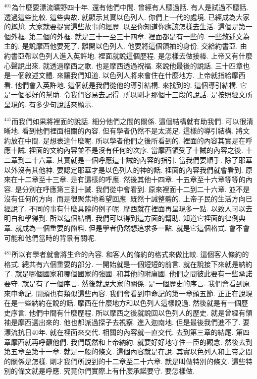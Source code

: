 \documentclass{book}
\begin{document}
$^{401}$為什麼要漂流曠野四十年.
還有他們中間.
曾經有人聽過話.
有人是試過不聽話.
透過這些比較.
這些典故.
就顯示其實以色列人.
你們上一代的處境.
已經成為大家的尷尬.
大家就要捉實這些故事的經歷.
以至你知道你應該怎樣去生活.
這個是第一個外框.
第二個的外框.
就是三十一至三十四章.
裡面都是有一些的.
一些敘述文為主的.
是說摩西他要死了.
離開以色列人.
他要將這個領袖的身份.
交給約書亞.
由約書亞帶以色列人進入英許地.
裡面就說這個歷程.
是怎樣去做接棒.
上帝又有什麼心聲說出來.
就透過摩西之歌.
也是摩西透過祝福.
來說他最後的說話.
三十四章也是一個敘述文體.
來讓我們知道.
以色列人將來會住在什麼地方.
上帝就指給摩西看.
他們會入英許地.
這個就是我們從他的導引結構.
來找到的.
這個導引結構.
它是一個挺好的幫助.
令我們容易去記得.
所以剛才那個十三段的說話.
是按照經文所呈現的.
有多少句說話來顯示.

$^{441}$而我們如果將裡面的說話.
細分他們之間的關係.
這個結構就有助我們.
可以很清晰地.
看到他們裡面相關的內容.
但有學者仍然不是太滿足.
這樣的導引結構.
將文約放在中間.
是想表達什麼呢.
所以學者他們之後所看到的.
裡面的內容其實是在呼應十誡.
裡面的文約內容並不是沒有任何的次序.
當摩西領受了十誡的內容之後.
十二章到二十六章.
其實就是一個呼應這十誡的內容的指引.
當我們要順手.
除了耶華以外沒有其他神.
要認定耶華才是以色列人的神的話.
裡面的內容我們就會看到.
原來在十二章至十三章.
是有這樣的呼應.
然後其他十四章.
十五章至十六章等等的內容.
是分別在呼應第三到十誡.
我們從中會看到.
原來裡面十二到二十六章.
並不是沒有任何的方向.
而是很聚焦地希望回應.
既然十誡整體的.
上帝子民的生活方向已經說了.
不同的事有什麼具體的例子呢.
摩西就在裡面再呈現多一點.
以致人可以去明白和學得到.
所以這個結構.
我們可以得到這方面的幫助.
知道它裡面的律例典章.
就成為一個重要的餡料.
但是學者仍然想追求多一點.
就是它這個格式.
會不會可能和他們當時的背景有關呢.

$^{481}$所以有學者就會將生命的內容.
和客人的條約的格式來做比較.
這個客人條約的格式.
總共有六個重要的部分.
一開始就是一個短短的前言.
就在說接下來就是納約了.
就是哪個國家和哪個國家的強國.
和其他的附庸國.
他們之間彼此要有一些承諾要守.
就是有了一個序言.
然後就說大家的關係.
是一個歷史的序言.
我們會看到原來申命記.
開頭也有類似這些內容.
我們會看到申命記的第一章頭五節.
正正在說現在是一些納約在說的話.
摩西在什麼地方和以色列人這樣說過.
然後就是有一個歷史序言.
他們中間有什麼歷程.
所以摩西之後就說回以色列人的歷史.
就是曾經有領袖是摩西選出來的.
他也都派過探子去視察.
進入迦南地.
但是最後我們進不了.
要漂流抗日40年.
就在裡面來交代.
相關的內容就一直交代.
去到第三章的結尾.
第四章摩西就再呼籲他們.
我們既然和上帝納約.
就要好好地守住一臣的觀念.
然後去到第五章至第十一章.
就是一般的條文.
這個內容就是在說.
其實以色列人和上帝之間的關係是怎樣.
剛才我們所說到的十二章至二十六章.
就是叫做特別的條文.
這些特別的條文就是呼應.
究竟你們實際上有什麼承諾要守.
要怎樣做.
\end{document}
